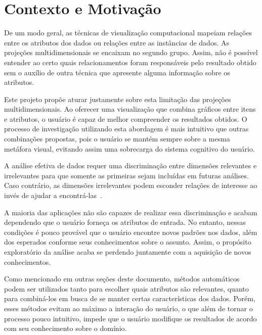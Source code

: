 
\section{Contexto e Motivação}

De um modo geral, as técnicas de visualização computacional mapeiam relações entre os atributos dos dados ou relações entre as instâncias de dados. As projeções multidimensionais se encaixam no segundo grupo. Assim, não é possível entender ao certo quais relacionamentos foram responsáveis pelo resultado obtido sem o auxílio de outra técnica que apresente alguma informação sobre os atributos.

Este projeto propõe aturar justamente sobre esta limitação das projeções multidimensionais. Ao oferecer uma visualização que combina gráficos entre itens e atributos, o usuário é capaz de melhor compreender os resultados obtidos. O processo de investigação utilizando esta abordagem é mais intuitivo que outras combinações propostas, pois o usuário se mantém sempre sobre a mesma metáfora visual, evitando assim uma sobrecarga do sistema cognitivo do usuário.

A análise efetiva de dados requer uma discriminação entre dimensões relevantes e irrelevantes para que somente as primeiras sejam incluídas em futuras análises. Caso contrário, as dimensões irrelevantes podem esconder relações de interesse ao invés de ajudar a encontrá-las~\cite{Guo2003}. 

A maioria das aplicações não são capazes de realizar essa discriminação e acabam dependendo que o usuário forneça os atributos de entrada. No entanto, nessas condições é pouco provável que o usuário encontre novos padrões nos dados, além dos esperados conforme seus conhecimentos sobre o assunto. Assim, o propósito exploratório da análise acaba se perdendo juntamente com a aquisição de novos conhecimentos.    

Como mencionado em outras seções deste documento, métodos automáticos podem ser utilizados tanto para escolher quais atributos são relevantes, quanto para combiná-los em busca de se manter certas características dos dados. Porém, esses métodos evitam ao máximo a interação do usuário, o que além de tornar o processo pouco intuitivo, impede que o usuário modifique os resultados de acordo com seu conhecimento sobre o domínio.

